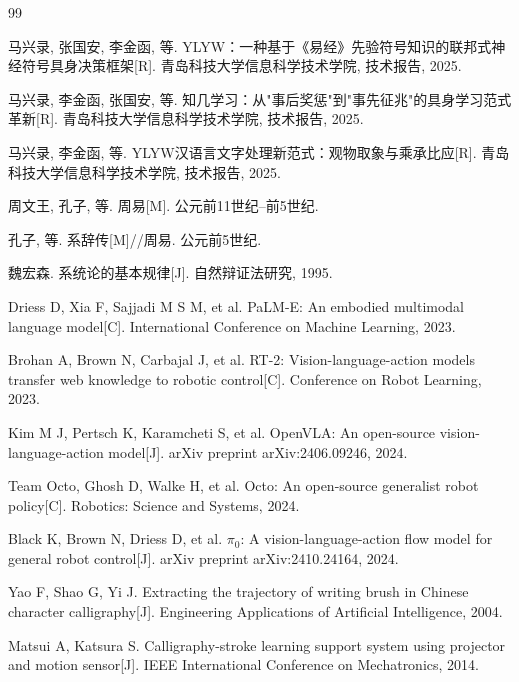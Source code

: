 
\begin{thebibliography}{99}

马兴录, 张国安, 李金函, 等.
YLYW：一种基于《易经》先验符号知识的联邦式神经符号具身决策框架[R].
青岛科技大学信息科学技术学院, 技术报告, 2025.

马兴录, 李金函, 张国安, 等.
知几学习：从"事后奖惩"到"事先征兆"的具身学习范式革新[R].
青岛科技大学信息科学技术学院, 技术报告, 2025.

马兴录, 李金函, 等.
YLYW汉语言文字处理新范式：观物取象与乘承比应[R].
青岛科技大学信息科学技术学院, 技术报告, 2025.

周文王, 孔子, 等.
周易[M].
公元前11世纪--前5世纪.

孔子, 等.
系辞传[M]//周易.
公元前5世纪.

魏宏森.
系统论的基本规律[J].
自然辩证法研究, 1995.

Driess D, Xia F, Sajjadi M S M, et al.
PaLM-E: An embodied multimodal language model[C].
International Conference on Machine Learning, 2023.

Brohan A, Brown N, Carbajal J, et al.
RT-2: Vision-language-action models transfer web knowledge to robotic control[C].
Conference on Robot Learning, 2023.

Kim M J, Pertsch K, Karamcheti S, et al.
OpenVLA: An open-source vision-language-action model[J].
arXiv preprint arXiv:2406.09246, 2024.

Team Octo, Ghosh D, Walke H, et al.
Octo: An open-source generalist robot policy[C].
Robotics: Science and Systems, 2024.

Black K, Brown N, Driess D, et al.
$\pi_0$: A vision-language-action flow model for general robot control[J].
arXiv preprint arXiv:2410.24164, 2024.

Yao F, Shao G, Yi J.
Extracting the trajectory of writing brush in Chinese character calligraphy[J].
Engineering Applications of Artificial Intelligence, 2004.

Matsui A, Katsura S.
Calligraphy-stroke learning support system using projector and motion sensor[J].
IEEE International Conference on Mechatronics, 2014.


\end{thebibliography}

